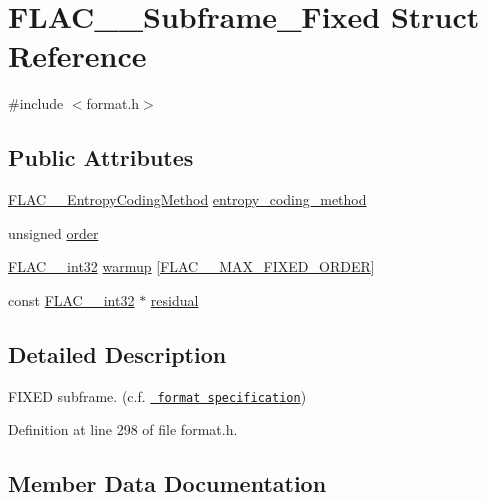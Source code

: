 \hypertarget{struct_f_l_a_c_____subframe___fixed}{}\section{F\+L\+A\+C\+\_\+\+\_\+\+Subframe\+\_\+\+Fixed Struct Reference}
\label{struct_f_l_a_c_____subframe___fixed}


{\ttfamily \#include $<$format.\+h$>$}

\subsection*{Public Attributes}
\begin{DoxyCompactItemize}
\item 
\mbox{\hyperlink{struct_f_l_a_c_____entropy_coding_method}{F\+L\+A\+C\+\_\+\+\_\+\+Entropy\+Coding\+Method}} \mbox{\hyperlink{struct_f_l_a_c_____subframe___fixed_a0f17f8f756cd2c8acc0262ef14c37088}{entropy\+\_\+coding\+\_\+method}}
\item 
unsigned \mbox{\hyperlink{struct_f_l_a_c_____subframe___fixed_a73f6f3cce3f811c81532729dbad2df0d}{order}}
\item 
\mbox{\hyperlink{ordinals_8h_a33fd77bfe6d685541a0c034a75deccdc}{F\+L\+A\+C\+\_\+\+\_\+int32}} \mbox{\hyperlink{struct_f_l_a_c_____subframe___fixed_a0e9a40fb89b8aa45f83bf8979d200f1f}{warmup}} \mbox{[}\mbox{\hyperlink{group__flac__format_gabd0d5d6fe71b337244712b244ae7cb0f}{F\+L\+A\+C\+\_\+\+\_\+\+M\+A\+X\+\_\+\+F\+I\+X\+E\+D\+\_\+\+O\+R\+D\+ER}}\mbox{]}
\item 
const \mbox{\hyperlink{ordinals_8h_a33fd77bfe6d685541a0c034a75deccdc}{F\+L\+A\+C\+\_\+\+\_\+int32}} $\ast$ \mbox{\hyperlink{struct_f_l_a_c_____subframe___fixed_ab91be48874aec97177106a4086163188}{residual}}
\end{DoxyCompactItemize}


\subsection{Detailed Description}
F\+I\+X\+ED subframe. (c.\+f. \href{../format.html\#subframe_fixed}{\texttt{ format specification}}) 

Definition at line 298 of file format.\+h.



\subsection{Member Data Documentation}
\mbox{\label{struct_f_l_a_c_____subframe___fixed_a0f17f8f756cd2c8acc0262ef14c37088}} 
